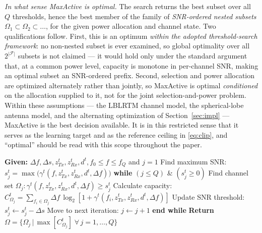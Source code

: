 \documentclass[journal]{IEEEtran}
\begin{document}
\emph{In what sense MaxActive is optimal.} The search returns the best subset over all
$Q$ thresholds, hence the best member of the family of \emph{SNR-ordered nested subsets}
$\Omega_1\subset\Omega_2\subset\dots$, for the given power allocation and channel state.
Two qualifications follow. First, this is an optimum \emph{within the adopted
threshold-search framework}: no non-nested subset is ever examined, so global optimality
over all $2^{|\mathcal{F}|}$ subsets is not claimed --- it would hold only under the
standard argument that, at a common power level, capacity is monotone in per-channel SNR,
making an optimal subset an SNR-ordered prefix. Second, selection and power allocation are
optimized alternately rather than jointly, so MaxActive is optimal \emph{conditioned} on
the allocation supplied to it, not for the joint selection-and-power problem. Within these
assumptions --- the LBLRTM channel model, the spherical-lobe antenna model, and the
alternating optimization of Section~\ref{sec:impl} --- MaxActive is the best decision
available. It is in this restricted sense that it serves as the learning target and as the
reference ceiling in \eqref{eq:clip}, and ``optimal'' should be read with this scope
throughout the paper.

\begin{algorithm}[!tbp]
\caption{MaxActive Channel Selection}
\label{alg:maxactive}
\begin{algorithmic}[1]
\State \textbf{Given:} $\Delta f, \Delta s, z^{t}_{Tx}, z^{t}_{Rx}, d^{t}, f_0 \le f \le f_Q$ and $j = 1$
\State Find maximum SNR:
\Statex \quad $s^{t}_{j} = \max\big(\gamma^{t}(f, z^{t}_{Tx}, z^{t}_{Rx}, d^{t}, \Delta f)\big)$
\State \textbf{while} $(j \le Q)$ \& $(s^{t}_{j} \ge 0)$
\State Find channel set $\Omega_j : \gamma^{t}(f, z^{t}_{Tx}, z^{t}_{Rx}, d^{t}, \Delta f) \ge s^{t}_{j}$
\State Calculate capacity:
\Statex \quad $C^{t}_{\Omega_j} = \sum_{f_i \in \Omega_j} \Delta f \, \log_2[1 + \gamma^{t}(f_i, z^{t}_{Tx}, z^{t}_{Rx}, d^{t}, \Delta f)]$
\State Update SNR threshold: $s^{t}_{j} \leftarrow s^{t}_{j} - \Delta s$
\State Move to next iteration: $j \leftarrow j + 1$
\State \textbf{end while}
\State \textbf{Return} $\Omega = \{\Omega_j \,|\, \max[C^{t}_{\Omega_j}] \; \forall \, j = 1, \dots, Q\}$
\end{algorithmic}
\end{algorithm}
\end{document}
